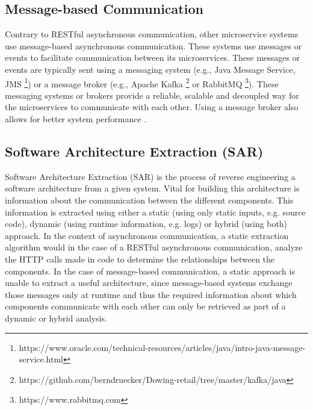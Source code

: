 \subsection{Message-based Communication}
\label{sec:Foundation:MessageBasedCommunication}
Contrary to RESTful asynchronous communication, other microservice systems use message-based asynchronous communication.
These systems use messages or events to facilitate communication between its microservices.
These messages or events are typically sent using a messaging system (e.g., Java Message Service, JMS \footnote{https://www.oracle.com/technical-resources/articles/java/intro-java-message-service.html}) or a message broker (e.g., Apache Kafka \footnote{https://github.com/berndruecker/Dowing-retail/tree/master/kafka/java} or RabbitMQ \footnote{https://www.rabbitmq.com}).
These messaging systems or brokers provide a reliable, scalable and decoupled way for the microservices to communicate with each other.
Using a message broker also allows for better system performance \cite{Singh2021}.


\subsection{Software Architecture Extraction (SAR)}
\label{sec:Foundation:SAR}
Software Architecture Extraction (SAR) is the process of reverse engineering a software architecture from a given system.
Vital for building this architecture is information about the communication between the different components.
This information is extracted using either a static (using only static inputs, e.g. source code), dynamic (using runtime information, e.g. logs) or hybrid (using both) approach.
In the context of asynchronous communication, a static extraction algorithm would in the case of a RESTful asynchronous communication, analyze the HTTP calls made in code to determine the relationships between the components.
In the case of message-based communication, a static approach is unable to extract a useful architecture, since message-based systems exchange those messages only at runtime and thus the required information about which components communicate with each other can only be retrieved as part of a dynamic or hybrid analysis. \cite{Singh2021,Mayer2018}


